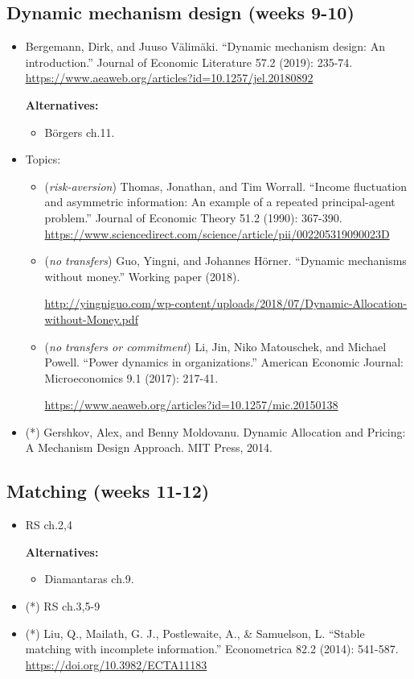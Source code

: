 \documentclass{article}
\begin{document}
\subsection{Dynamic mechanism design (weeks 9-10)}
\begin{itemize}
	\item Bergemann, Dirk, and Juuso Välimäki. ``Dynamic mechanism design: An introduction.'' Journal of Economic Literature 57.2 (2019): 235-74. \\
	\url{https://www.aeaweb.org/articles?id=10.1257/jel.20180892}
	
	\textbf{Alternatives:}
	\begin{itemize}
		\item B{\"o}rgers ch.11.
	\end{itemize}
	\item Topics:
	\begin{itemize}
		\item (\emph{risk-aversion}) Thomas, Jonathan, and Tim Worrall. ``Income fluctuation and asymmetric information: An example of a repeated principal-agent problem.'' Journal of Economic Theory 51.2 (1990): 367-390. \url{https://www.sciencedirect.com/science/article/pii/002205319090023D}
		\item (\emph{no transfers}) Guo, Yingni, and Johannes Hörner. ``Dynamic mechanisms without money.'' Working paper (2018). 
		
		\url{http://yingniguo.com/wp-content/uploads/2018/07/Dynamic-Allocation-without-Money.pdf}
		\item (\emph{no transfers or commitment}) Li, Jin, Niko Matouschek, and Michael Powell. ``Power dynamics in organizations.'' American Economic Journal: Microeconomics 9.1 (2017): 217-41.
		
		\url{https://www.aeaweb.org/articles?id=10.1257/mic.20150138}
	\end{itemize}
	\item (*) Gershkov, Alex, and Benny Moldovanu. Dynamic Allocation and Pricing: A Mechanism Design Approach. MIT Press, 2014. 
\end{itemize}

\subsection{Matching (weeks 11-12)}
\begin{itemize}
	\item RS ch.2,4
	
	\textbf{Alternatives:}
	\begin{itemize}
		\item Diamantaras ch.9.
	\end{itemize}
	\item (*) RS ch.3,5-9
	\item (*) Liu, Q., Mailath, G. J., Postlewaite, A., \& Samuelson, L.  ``Stable matching with incomplete information.'' Econometrica 82.2 (2014): 541-587. \url{https://doi.org/10.3982/ECTA11183}
\end{itemize}
\end{document}
